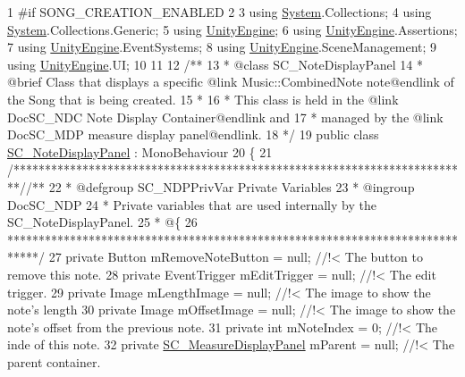 \begin{DoxyCodeInclude}
1 \textcolor{preprocessor}{#if SONG\_CREATION\_ENABLED}
2 
3 \textcolor{keyword}{using} \hyperlink{namespace_system}{System}.Collections;
4 \textcolor{keyword}{using} \hyperlink{namespace_system}{System}.Collections.Generic;
5 \textcolor{keyword}{using} \hyperlink{namespace_unity_engine}{UnityEngine};
6 \textcolor{keyword}{using} \hyperlink{namespace_unity_engine}{UnityEngine}.Assertions;
7 \textcolor{keyword}{using} \hyperlink{namespace_unity_engine}{UnityEngine}.EventSystems;
8 \textcolor{keyword}{using} \hyperlink{namespace_unity_engine}{UnityEngine}.SceneManagement;
9 \textcolor{keyword}{using} \hyperlink{namespace_unity_engine}{UnityEngine}.UI;
10 
11 \textcolor{comment}{}
12 \textcolor{comment}{/**}
13 \textcolor{comment}{* @class SC\_NoteDisplayPanel}
14 \textcolor{comment}{* @brief Class that displays a specific @link Music::CombinedNote note@endlink of the Song that is being
       created.}
15 \textcolor{comment}{* }
16 \textcolor{comment}{* This class is held in the @link DocSC\_NDC Note Display Container@endlink and}
17 \textcolor{comment}{* managed by the @link DocSC\_MDP measure display panel@endlink.}
18 \textcolor{comment}{*/}
19 \textcolor{keyword}{public} \textcolor{keyword}{class }\hyperlink{class_s_c___note_display_panel}{SC\_NoteDisplayPanel} : MonoBehaviour
20 \{
21     \textcolor{comment}{/*************************************************************************/}\textcolor{comment}{/** }
22 \textcolor{comment}{    * @defgroup SC\_NDPPrivVar Private Variables}
23 \textcolor{comment}{    * @ingroup DocSC\_NDP}
24 \textcolor{comment}{    * Private variables that are used internally by the SC\_NoteDisplayPanel.}
25 \textcolor{comment}{    * @\{}
26 \textcolor{comment}{    *****************************************************************************/}
27     \textcolor{keyword}{private} Button mRemoveNoteButton = null; \textcolor{comment}{//!< The button to remove this note.}
28 \textcolor{comment}{}    \textcolor{keyword}{private} EventTrigger mEditTrigger = null; \textcolor{comment}{//!< The edit trigger.}
29 \textcolor{comment}{}    \textcolor{keyword}{private} Image mLengthImage = null; \textcolor{comment}{//!< The image to show the note's length}
30 \textcolor{comment}{}    \textcolor{keyword}{private} Image mOffsetImage = null; \textcolor{comment}{//!< The image to show the note's offset from the previous note.}
31 \textcolor{comment}{}    \textcolor{keyword}{private} \textcolor{keywordtype}{int} mNoteIndex = 0; \textcolor{comment}{//!< The inde of this note.}
32 \textcolor{comment}{}    \textcolor{keyword}{private} \hyperlink{class_s_c___measure_display_panel}{SC\_MeasureDisplayPanel} mParent = null; \textcolor{comment}{//!< The parent container.}

\end{DoxyCodeInclude}
